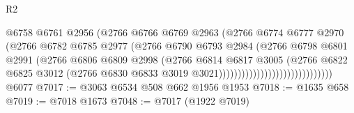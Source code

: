 \begin{lexlean}{R2}
\begin{coremodule}
                                              @6758
                                              @6761
                                              @2956
                                              (@2766
                                                @6766
                                                @6769
                                                @2963
                                                (@2766
                                                  @6774
                                                  @6777
                                                  @2970
                                                  (@2766
                                                    @6782
                                                    @6785
                                                    @2977
                                                    (@2766
                                                      @6790
                                                      @6793
                                                      @2984
                                                      (@2766
                                                        @6798
                                                        @6801
                                                        @2991
                                                        (@2766
                                                          @6806
                                                          @6809
                                                          @2998
                                                          (@2766
                                                            @6814
                                                            @6817
                                                            @3005
                                                            (@2766
                                                              @6822
                                                              @6825
                                                              @3012
                                                              (@2766
                                                                @6830
                                                                @6833
                                                                @3019
                                                                @3021))))))))))))))))))))))))))))))
    @6077
@7017 := @3063 @6534 @508 @662 @1956 @1953
@7018 := @1635 @658
@7019 := @7018 @1673
@7048 := @7017
    (@1922 @7019)

\end{coremodule}
\end{lexlean}
